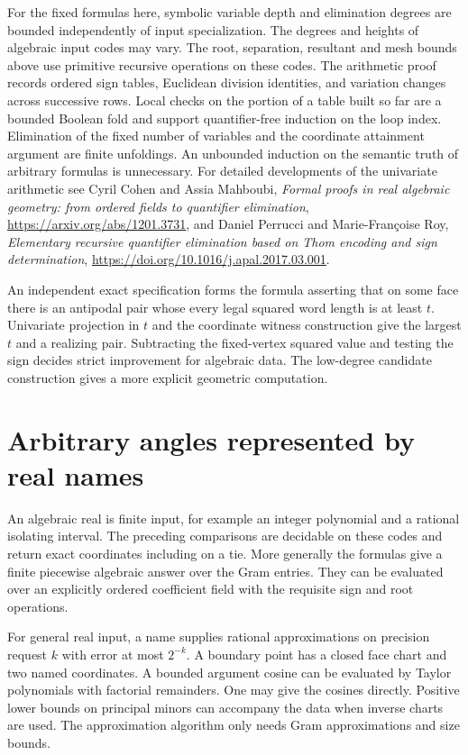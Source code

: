 \documentclass[10pt,letterpaper]{article}
\begin{document}
For the fixed formulas here, symbolic variable depth and elimination
degrees are bounded independently of input specialization. The degrees
and heights of algebraic input codes may vary. The root, separation,
resultant and mesh bounds above use primitive recursive operations
on these codes. The arithmetic proof records ordered sign tables,
Euclidean division identities, and variation changes across successive
rows. Local checks on the portion of a table built so far are a
bounded Boolean fold and support quantifier-free induction on the
loop index. Elimination of the fixed number of variables and the
coordinate attainment argument are finite unfoldings. An unbounded
induction on the semantic truth of arbitrary formulas is unnecessary.
For detailed developments of the univariate arithmetic see Cyril
Cohen and Assia Mahboubi, \emph{Formal proofs in real algebraic
geometry: from ordered fields to quantifier elimination},
\url{https://arxiv.org/abs/1201.3731}, and Daniel Perrucci and
Marie-Fran\c{c}oise Roy, \emph{Elementary recursive quantifier
elimination based on Thom encoding and sign determination},
\url{https://doi.org/10.1016/j.apal.2017.03.001}.

An independent exact specification forms the formula asserting that
on some face there is an antipodal pair whose every legal squared
word length is at least $t$. Univariate projection in $t$ and the
coordinate witness construction give the largest $t$ and a realizing
pair. Subtracting the fixed-vertex squared value and testing the sign
decides strict improvement for algebraic data. The low-degree
candidate construction gives a more explicit geometric computation.

\section{Arbitrary angles represented by real names}\label{sec:names}
An algebraic real is finite input, for example an integer polynomial and
a rational isolating interval. The preceding comparisons are decidable
on these codes and return exact coordinates including on a tie. More
generally the formulas give a finite piecewise algebraic answer over
the Gram entries. They can be evaluated over an explicitly ordered
coefficient field with the requisite sign and root operations.

For general real input, a name supplies rational approximations on
precision request $k$ with error at most $2^{-k}$. A boundary point
has a closed face chart and two named coordinates. A bounded argument
cosine can be evaluated by Taylor polynomials with factorial remainders.
One may give the cosines directly. Positive lower bounds on principal
minors can accompany the data when inverse charts are used. The
approximation algorithm only needs Gram approximations and size bounds.
\end{document}
